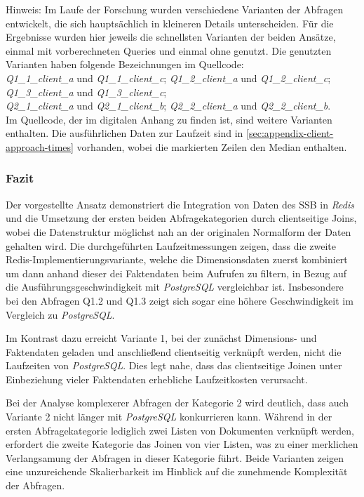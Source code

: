 Hinweis: Im Laufe der Forschung wurden verschiedene Varianten der Abfragen entwickelt, die sich hauptsächlich in kleineren Details unterscheiden. Für die Ergebnisse wurden hier jeweils die schnellsten Varianten der beiden Ansätze, einmal mit vorberechneten Queries und einmal ohne genutzt. Die genutzten Varianten haben folgende Bezeichnungen im Quellcode:\\
\emph{Q1\_1\_client\_a} und \emph{Q1\_1\_client\_c}; \emph{Q1\_2\_client\_a} und \emph{Q1\_2\_client\_c};\\ \emph{Q1\_3\_client\_a} und \emph{Q1\_3\_client\_c};\\ \emph{Q2\_1\_client\_a} und \emph{Q2\_1\_client\_b}; \emph{Q2\_2\_client\_a} und \emph{Q2\_2\_client\_b}.
\\Im Quellcode, der im digitalen Anhang zu finden ist, sind weitere Varianten enthalten. %
Die ausführlichen Daten zur Laufzeit sind in \cref{sec:appendix-client-approach-times} vorhanden, wobei die markierten Zeilen den Median enthalten.

\subsubsection{Fazit}
Der vorgestellte Ansatz demonstriert die Integration von Daten des \ac{SSB} in \emph{Redis} und die Umsetzung der ersten beiden Abfragekategorien durch clientseitige Joins, wobei die Datenstruktur möglichst nah an der originalen Normalform der Daten gehalten wird. Die durchgeführten Laufzeitmessungen zeigen, dass die zweite Redis-Implementierungsvariante, welche die Dimensionsdaten zuerst kombiniert um dann anhand dieser dei Faktendaten beim Aufrufen zu filtern, in Bezug auf die Ausführungsgeschwindigkeit mit \emph{PostgreSQL} vergleichbar ist. Insbesondere bei den Abfragen Q1.2 und Q1.3 zeigt sich sogar eine höhere Geschwindigkeit im Vergleich zu \emph{PostgreSQL}.

Im Kontrast dazu erreicht Variante 1, bei der zunächst Dimensions- und Faktendaten geladen und anschließend clientseitig verknüpft werden, nicht die Laufzeiten von \emph{PostgreSQL}. Dies legt nahe, dass das clientseitige Joinen unter Einbeziehung vieler Faktendaten erhebliche Laufzeitkosten verursacht.

Bei der Analyse komplexerer Abfragen der Kategorie 2 wird deutlich, dass auch Variante 2 nicht länger mit \emph{PostgreSQL} konkurrieren kann. Während in der ersten Abfragekategorie lediglich zwei Listen von Dokumenten verknüpft werden, erfordert die zweite Kategorie das Joinen von vier Listen, was zu einer merklichen Verlangsamung der Abfragen in dieser Kategorie führt. Beide Varianten zeigen eine unzureichende Skalierbarkeit im Hinblick auf die zunehmende Komplexität der Abfragen.

